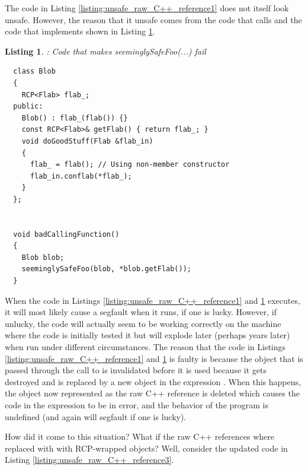 \documentclass[pdf,ps2pdf,11pt]{SANDreport}
\newtheorem{listing}{Listing}
\begin{document}
The code in Listing {}\ref{listing:unsafe_raw_C++_reference1} does not
itself look unsafe.  However, the reason that it unsafe comes from the
code that calls {} and the code that
implements {} shown in Listing
{}\ref{listing:unsafe_raw_C++_reference2}.


{}\begin{listing}: Code that makes seeminglySafeFoo(...) fail
\label{listing:unsafe_raw_C++_reference2}
{\small\begin{verbatim}
  class Blob
  {
    RCP<Flab> flab_;
  public:
    Blob() : flab_(flab()) {}
    const RCP<Flab>& getFlab() { return flab_; }
    void doGoodStuff(Flab &flab_in)
    {
      flab_ = flab(); // Using non-member constructor
      flab_in.conflab(*flab_);
    }
  };


  void badCallingFunction()
  {
    Blob blob;
    seeminglySafeFoo(blob, *blob.getFlab());
  }
\end{verbatim}}
\end{listing}


When the code in Listings {}\ref{listing:unsafe_raw_C++_reference1}
and {}\ref{listing:unsafe_raw_C++_reference2} executes, it will most
likely cause a segfault when it runs, if one is lucky.  However, if
unlucky, the code will actually seem to be working correctly on the
machine where the code is initially tested it but will explode later
(perhaps years later) when run under different circumstances.  The
reason that the code in Listings
{}\ref{listing:unsafe_raw_C++_reference1} and
{}\ref{listing:unsafe_raw_C++_reference2} is faulty is because the
{} object that is passed through the call
{} to
{} is invalidated before it is used
because it gets destroyed and is replaced by a new object in the
expression {}.  When this happens, the object now
represented as the raw C++ reference {} is deleted which
causes the code in the expression {}
to be in error, and the behavior of the program is undefined (and
again will segfault if one is lucky).

How did it come to this situation?  What if the raw C++ references
where replaced with with RCP-wrapped objects?  Well, consider the
updated code in Listing {}\ref{listing:unsafe_raw_C++_reference3}.
\end{document}
